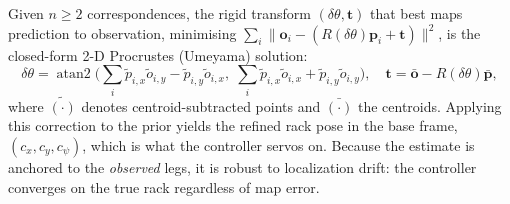 \documentclass[11pt,a4paper]{article}
\begin{document}
Given $n\!\ge\!2$ correspondences, the rigid transform $(\delta\theta,\mathbf t)$
that best maps prediction to observation, minimising
$\sum_i\lVert\mathbf o_i-(R(\delta\theta)\mathbf p_i+\mathbf t)\rVert^2$, is the
closed-form 2-D Procrustes (Umeyama) solution:
\begin{equation}
\delta\theta=\operatorname{atan2}\!\Big(\textstyle\sum_i \tilde p_{i,x}\tilde o_{i,y}-\tilde p_{i,y}\tilde o_{i,x},\;
\sum_i \tilde p_{i,x}\tilde o_{i,x}+\tilde p_{i,y}\tilde o_{i,y}\Big),
\quad \mathbf t=\bar{\mathbf o}-R(\delta\theta)\bar{\mathbf p},
\end{equation}
where $\tilde{(\cdot)}$ denotes centroid-subtracted points and
$\bar{(\cdot)}$ the centroids. Applying this correction to the prior yields
the refined rack pose in the base frame,
$(c_x,c_y,c_\psi)$, which is what the controller servos on. Because the
estimate is anchored to the \emph{observed} legs, it is robust to
localization drift: the controller converges on the true rack regardless of
map error.
\end{document}
